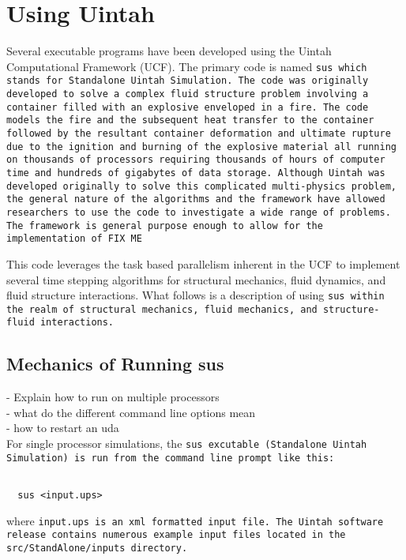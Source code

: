 \section{Using Uintah} \label{Sec:UCF}

Several executable programs have been developed using the Uintah
Computational Framework (UCF).  The primary code is named \tt sus
\normalfont which stands for Standalone Uintah Simulation.  The code
was originally developed to solve a complex fluid structure problem
involving a container filled with an explosive enveloped in a fire.
The code models the fire and the subsequent heat transfer to the
container followed by the resultant container deformation and ultimate
rupture due to the ignition and burning of the explosive material all
running on thousands of processors requiring thousands of hours of
computer time and hundreds of gigabytes of data storage.  Although
Uintah was developed originally to solve this complicated
multi-physics problem, the general nature of the algorithms and the
framework have allowed researchers to use the code to investigate a
wide range of problems.  The framework is general purpose enough to
allow for the implementation of FIX ME

This code leverages the task based parallelism inherent in the UCF to
implement several time stepping algorithms for structural mechanics,
fluid dynamics, and fluid structure interactions.  What follows is a
description of using \tt sus \normalfont within the realm of structural mechanics,
fluid mechanics, and structure-fluid interactions.



\subsection{Mechanics of Running sus}
 - Explain how to run on multiple processors\\
 - what do the different command line options mean\\
 - how to restart an uda\\

For single processor simulations, the \tt sus \normalfont excutable
(Standalone Uintah Simulation) is run from the command line prompt
like this:
\begin{Verbatim}[fontsize=\footnotesize]
  
  sus <input.ups>

\end{Verbatim}
where \tt input.ups \normalfont is an xml formatted input file.  The Uintah
software release contains numerous example input files located in the
src/StandAlone/inputs directory.


